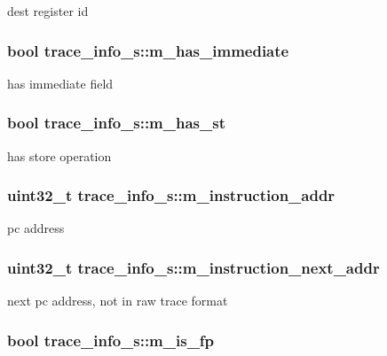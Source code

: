 dest register id \hypertarget{structtrace__info__s_a6e9e5fde0737c4e51ce33a6496b25a70}{
\subsubsection[{m\_\-has\_\-immediate}]{\setlength{\rightskip}{0pt plus 5cm}bool {\bf trace\_\-info\_\-s::m\_\-has\_\-immediate}}}
\label{structtrace__info__s_a6e9e5fde0737c4e51ce33a6496b25a70}
has immediate field \hypertarget{structtrace__info__s_a2a7aac8fd68b989cc00b99c1a983717f}{
\subsubsection[{m\_\-has\_\-st}]{\setlength{\rightskip}{0pt plus 5cm}bool {\bf trace\_\-info\_\-s::m\_\-has\_\-st}}}
\label{structtrace__info__s_a2a7aac8fd68b989cc00b99c1a983717f}
has store operation \hypertarget{structtrace__info__s_a9f16025655389f3f53d5185f74feb5fb}{
\subsubsection[{m\_\-instruction\_\-addr}]{\setlength{\rightskip}{0pt plus 5cm}uint32\_\-t {\bf trace\_\-info\_\-s::m\_\-instruction\_\-addr}}}
\label{structtrace__info__s_a9f16025655389f3f53d5185f74feb5fb}
pc address \hypertarget{structtrace__info__s_a8622989464f39453ee044c599367dfe3}{
\subsubsection[{m\_\-instruction\_\-next\_\-addr}]{\setlength{\rightskip}{0pt plus 5cm}uint32\_\-t {\bf trace\_\-info\_\-s::m\_\-instruction\_\-next\_\-addr}}}
\label{structtrace__info__s_a8622989464f39453ee044c599367dfe3}
next pc address, not in raw trace format \hypertarget{structtrace__info__s_ac504bfb834947ca4af12b22a70a16231}{
\subsubsection[{m\_\-is\_\-fp}]{\setlength{\rightskip}{0pt plus 5cm}bool {\bf trace\_\-info\_\-s::m\_\-is\_\-fp}}}
